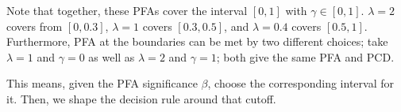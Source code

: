 \begin{example}
    Note that together, these PFAs cover the interval $[0, 1]$ with $\gamma \in [0, 1]$. $\lambda = 2$ covers from $[0, 0.3]$, $\lambda = 1$ covers $[0.3, 0.5]$, and $\lambda = 0.4$ covers $[0.5, 1]$.
    Furthermore, PFA at the boundaries can be met by two different choices; take $\lambda = 1$ and $\gamma = 0$ as well as $\lambda = 2$ and $\gamma = 1$; both give the same PFA and PCD.

    This means, given the PFA significance $\beta$, choose the corresponding interval for it. Then, we shape the decision rule around that cutoff.
\end{example}